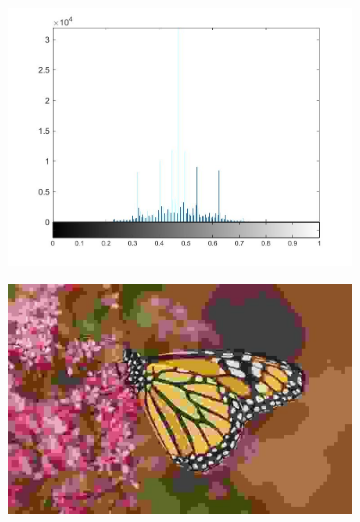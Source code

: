 \begin{figure}
\begin{subfigure}[b]{0.23\textwidth}
         \caption{}
         \label{fig:nss10}
     \end{subfigure}
     \begin{subfigure}[b]{0.23\textwidth}
         \centering
         \includegraphics[width=\textwidth]{./figs/mscn_histmjpeg}
         \caption{}
         \label{fig:nss11}
     \end{subfigure}
     \begin{subfigure}[b]{0.23\textwidth}
         \centering
         \includegraphics[width=\textwidth]{./figs/mjpeg}
         \caption{}
         \label{fig:nss12}
     \end{subfigure}
     \\
     \begin{subfigure}[b]{0.23\textwidth}
         \centering

\end{subfigure}
\end{figure}
